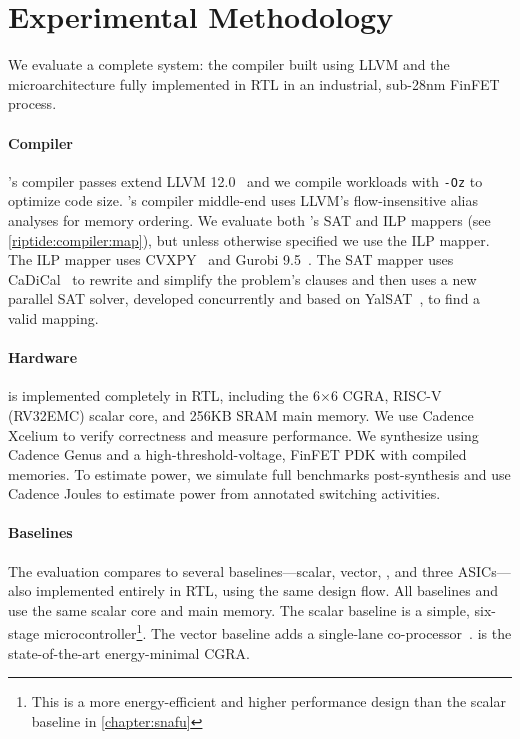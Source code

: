 \section{Experimental Methodology}
\label{riptide:method}

We evaluate a complete \riptide system: the compiler built using LLVM and the
microarchitecture fully implemented in RTL in an industrial, sub-28nm FinFET process.

\paragraph{Compiler}
\riptide's compiler passes extend LLVM 12.0~\cite{llvm} and we compile workloads with
\texttt{-Oz} to optimize code size.  
% 
\riptide's compiler middle-end uses LLVM's
flow-insensitive alias analyses for memory ordering.
%
We evaluate both \riptide's SAT and ILP mappers (see \autoref{riptide:compiler:map}), but unless otherwise specified we use the ILP mapper.
% 
The ILP mapper uses CVXPY~\cite{cvxpy} and Gurobi 9.5~\cite{gurobi}.
%
The SAT mapper uses CaDiCal~\cite{cadical} to rewrite and simplify the problem's clauses and then uses a new parallel SAT solver, developed concurrently and based on YalSAT~\cite{yalsat}, to find a valid mapping.

\paragraph{Hardware}
\label{method:hardware}
\riptide is implemented completely in RTL, including the 6$\times$6 CGRA, RISC-V
(RV32EMC) scalar core, and 256KB
SRAM main memory. 
% 
We use Cadence Xcelium to verify correctness and measure
performance.
% 
We synthesize \riptide using Cadence Genus and a
high-threshold-voltage, FinFET PDK with compiled memories.
% 
To estimate power, we simulate full benchmarks post-synthesis and use Cadence
Joules to estimate power from annotated switching activities.

\paragraph{Baselines}
The evaluation compares to several baselines---scalar, vector, \snafu, and
three ASICs---also implemented entirely in RTL, using the same design
flow.
% 
All baselines and \riptide use the same scalar core and main memory.
% 
The scalar baseline is a simple, six-stage microcontroller\footnote{This is a more energy-efficient and higher performance design than the scalar baseline in \autoref{chapter:snafu}}.
% 
The vector baseline adds a single-lane co-processor~\cite{manic}.
% 
\snafu is the state-of-the-art energy-minimal CGRA.

